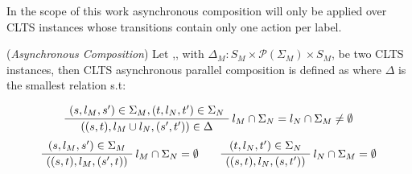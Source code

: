 
In the scope of this work asynchronous composition will only be applied over CLTS instances whose transitions contain only one action per label.

\begin{definition} 
	\label{def:asynchronous_composition}(\emph{Asynchronous Composition}) Let ,, with $\Delta_M : S_M \times \mathcal{P}(\Sigma_M) \times S_M$, be two CLTS instances, then CLTS asynchronous parallel composition is defined as  where $\Delta$ is the smallest relation s.t:
	\begin{center}
		\begin{equation}
		\AxiomC{$(s, l_M, s') \in \Sigma_M,(t, l_N, t') \in \Sigma_N  $}\RightLabel{$l_M \cap \Sigma_N = l_N \cap \Sigma_M \neq \emptyset$}
		\UnaryInfC{$((s,t),l_M \cup l_N,(s',t')) \in \Delta$}
		\DisplayProof
		\end{equation}	
		\begin{equation}
		\AxiomC{$(s, l_M, s') \in \Sigma_M $}\RightLabel{$l_M \cap \Sigma_N = \emptyset$}
		\UnaryInfC{$((s,t),l_M,(s',t))$}
		\DisplayProof
		\quad\quad
		\AxiomC{$(t, l_N, t') \in \Sigma_N $}\RightLabel{$l_N \cap \Sigma_M = \emptyset$}
		\UnaryInfC{$((s,t),l_N,(s,t'))$}
		\DisplayProof
		\end{equation}
	\end{center}
\end{definition}

